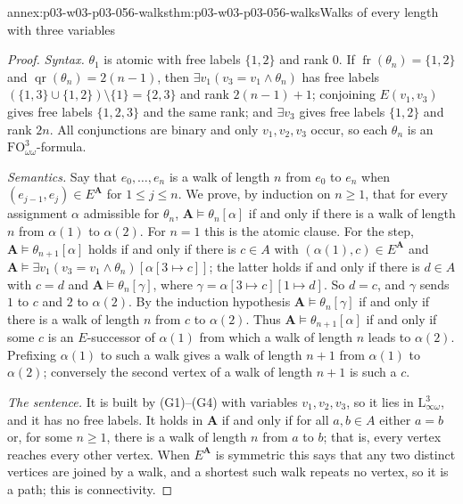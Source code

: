 \begin{annexitem}{annex:p03-w03-p03-056-walks}{thm:p03-w03-p03-056-walks}{Walks of every length with three variables}
\begin{proof}
\emph{Syntax.} \(\theta_1\) is atomic with free labels \(\{1,2\}\) and rank
\(0\). If \(\operatorname{fr}(\theta_n)=\{1,2\}\) and
\(\operatorname{qr}(\theta_n)=2(n-1)\), then
\(\exists v_1(v_3=v_1\land\theta_n)\) has free labels
\((\{1,3\}\cup\{1,2\})\setminus\{1\}=\{2,3\}\) and rank \(2(n-1)+1\);
conjoining \(E(v_1,v_3)\) gives free labels \(\{1,2,3\}\) and the same rank;
and \(\exists v_3\) gives free labels \(\{1,2\}\) and rank \(2n\). All
conjunctions are binary and only \(v_1,v_2,v_3\) occur, so each
\(\theta_n\) is an \(\mathrm{FO}^3_{\omega\omega}\)-formula.

\emph{Semantics.} Say that \(e_0,\ldots,e_n\) is a walk of length \(n\) from
\(e_0\) to \(e_n\) when \((e_{j-1},e_j)\in E^{\mathbf A}\) for
\(1\leq j\leq n\). We prove, by induction on \(n\geq1\), that for every
assignment \(\alpha\) admissible for \(\theta_n\),
\(\mathbf A\models\theta_n[\alpha]\) if and only if there is a walk of length
\(n\) from \(\alpha(1)\) to \(\alpha(2)\). For \(n=1\) this is the atomic
clause. For the step,
\(\mathbf A\models\theta_{n+1}[\alpha]\) holds if and only if there is
\(c\in A\) with \((\alpha(1),c)\in E^{\mathbf A}\) and
\(\mathbf A\models\exists v_1(v_3=v_1\land\theta_n)[\alpha[3\mapsto c]]\);
the latter holds if and only if there is \(d\in A\) with \(c=d\) and
\(\mathbf A\models\theta_n[\gamma]\), where
\(\gamma=\alpha[3\mapsto c][1\mapsto d]\). So \(d=c\), and \(\gamma\)
sends \(1\) to \(c\) and \(2\) to \(\alpha(2)\). By the induction hypothesis
\(\mathbf A\models\theta_n[\gamma]\) if and only if there is a walk of
length \(n\) from \(c\) to \(\alpha(2)\). Thus
\(\mathbf A\models\theta_{n+1}[\alpha]\) if and only if some \(c\) is an
\(E\)-successor of \(\alpha(1)\) from which a walk of length \(n\) leads to
\(\alpha(2)\). Prefixing \(\alpha(1)\) to such a walk gives a walk of length
\(n+1\) from \(\alpha(1)\) to \(\alpha(2)\); conversely the second vertex of
a walk of length \(n+1\) is such a \(c\).

\emph{The sentence.} It is built by (G1)--(G4) with variables
\(v_1,v_2,v_3\), so it lies in \(\mathrm{L}^3_{\infty\omega}\), and it has
no free labels. It holds in \(\mathbf A\) if and only if for all
\(a,b\in A\) either \(a=b\) or, for some \(n\geq1\), there is a walk of
length \(n\) from \(a\) to \(b\); that is, every vertex reaches every other
vertex. When \(E^{\mathbf A}\) is symmetric this says that any two distinct
vertices are joined by a walk, and a shortest such walk repeats no vertex,
so it is a path; this is connectivity.
\end{proof}
\end{annexitem}

